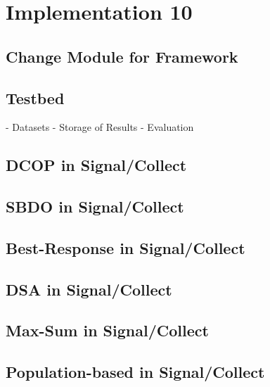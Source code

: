\chapter{Implementation 10}
\section{Change Module for Framework}
\section{Testbed}

- Datasets
- Storage of Results
- Evaluation

\section{DCOP in Signal/Collect}
\section{SBDO in Signal/Collect}
\section{Best-Response in Signal/Collect}
\section{DSA in Signal/Collect}
\section{Max-Sum in Signal/Collect}
\section{Population-based in Signal/Collect}